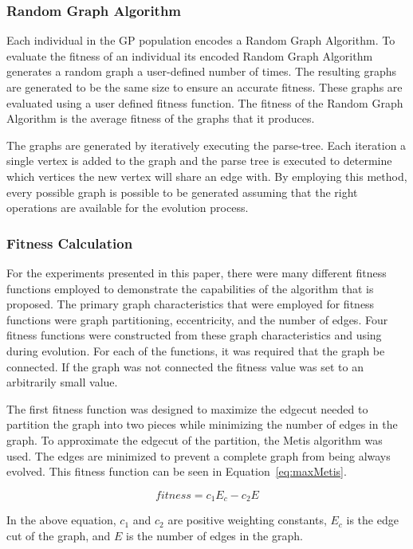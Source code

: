 \documentclass{article}
\begin{document}
\subsubsection{Random Graph Algorithm}
Each individual in the GP population encodes a Random Graph Algorithm. To evaluate the fitness of an individual its encoded Random Graph Algorithm generates
a random graph a user-defined number of times. The resulting graphs are generated to be the same size to ensure an accurate fitness. These graphs are evaluated 
using a user defined fitness function. The fitness of the Random Graph Algorithm is the average fitness of the graphs that it produces. 

The graphs are generated by iteratively executing the parse-tree. Each iteration a single vertex is added to the graph and the parse tree is executed to determine
which vertices the new vertex will share an edge with. By employing this method, every possible graph is possible to be generated assuming that the right operations 
are available for the evolution process. 

\subsubsection{Fitness Calculation}
For the experiments presented in this paper, there were many different fitness functions employed to demonstrate the capabilities of the algorithm that
is proposed. The primary graph characteristics that were employed for fitness functions were graph partitioning, eccentricity, and the number of edges.  
Four fitness functions were constructed from these graph characteristics and using during evolution. For each of the functions, it was required that the graph
be connected. If the graph was not connected the fitness value was set to an arbitrarily small value.

The first fitness function was designed to maximize 
the edgecut needed to partition the graph into two pieces while minimizing the number of edges in the graph. To approximate the edgecut of the partition,
the Metis algorithm was used. The edges are minimized to prevent a complete graph from being always evolved. This fitness function can be seen in Equation~\ref{eq:maxMetis}.

\begin{equation}
\label{eq:maxMetis}
fitness = c_1E_c - c_2E
\end{equation}

In the above equation, $c_1$ and $c_2$ are positive weighting constants, $E_c$ is the edge cut of the graph, and $E$ is the number of edges in the graph.
\end{document}
